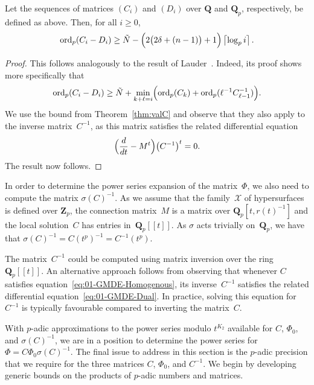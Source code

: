 \begin{thm}
Let the sequences of matrices $(C_i)$ and $(D_i)$ over $\mathbf{Q}$ and 
$\mathbf{Q}_p$, respectively, be defined as above.  Then, for all $i \geq 0$, 
\begin{equation*}
\operatorname{ord}_p(C_i - D_i) \geq 
    \tilde{N} - \Bigl(2 \bigl(2 \delta + (n-1)\bigr) + 1\Bigr) \left\lceil\log_p i\right\rceil.
\end{equation*}
\end{thm}

\begin{proof}
This follows analogously to the result of 
Lauder~\citep[Theorem~5.1]{Lauder2006}.  
Indeed, its proof shows more specifically that 
\begin{equation*}
\operatorname{ord}_p(C_i - D_i) \geq 
    \tilde{N} + \min_{k+\ell=i} \Bigl(\operatorname{ord}_p(C_k) + 
                                      \operatorname{ord}_p(\ell^{-1} C_{\ell-1}^{-1})\Bigr).
\end{equation*}
We use the bound from Theorem~\ref{thm:valC} and observe that they 
also apply to the inverse matrix~$C^{-1}$, as this matrix satisfies 
the related differential equation 
\begin{equation} \label{eq:01-GMDE-Dual}
\Bigl(\frac{d}{dt} - M^t\Bigr) \bigl(C^{-1}\bigr)^t = 0.
\end{equation}
The result now follows.
\end{proof}

\begin{rem}
In order to determine the power series expansion of the matrix~$\Phi$, 
we also need to compute the matrix $\sigma(C)^{-1}$.  As we assume that 
the family~$\mathcal{X}$ of hypersurfaces is defined over $\mathbf{Z}_p$, 
the connection matrix~$M$ is a matrix over $\mathbf{Q}_p[t,r(t)^{-1}]$ 
and the local solution~$C$ has entries in~$\mathbf{Q}_p[[t]]$.  
As $\sigma$ acts trivially on~$\mathbf{Q}_p$, we have that 
$\sigma(C)^{-1} = C(t^p)^{-1} = C^{-1}(t^p)$. 

The matrix~$C^{-1}$ could be computed using matrix inversion 
over the ring $\mathbf{Q}_p[[t]]$.  An alternative approach 
follows from observing that whenever $C$ satisfies 
equation~\eqref{eq:01-GMDE-Homogenous}, its inverse~$C^{-1}$ 
satisfies the related differential equation~\eqref{eq:01-GMDE-Dual}. 
In practice, solving this equation for $C^{-1}$ is typically favourable 
compared to inverting the matrix~$C$.
\end{rem}

With $p$-adic approximations to the power series modulo $t^{K_2}$ available 
for $C$, $\Phi_0$, and $\sigma(C)^{-1}$, we are in a position to determine 
the power series for $\Phi = C \Phi_0 \sigma(C)^{-1}$.  The final issue 
to address in this section is the $p$-adic precision that we require for 
the three matrices $C$, $\Phi_0$, and $C^{-1}$.
We begin by developing generic bounds on the products of $p$-adic numbers 
and matrices.

